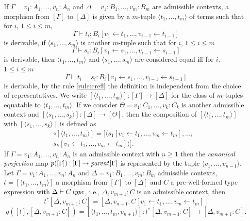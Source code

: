 If $\Gamma = v_1 \colon A_1, \dots, v_n \colon A_n$ and $\Delta = v_1 \colon B_1, \dots, v_m \colon B_m$
are admissible contexts, a morphism from $[\Gamma]$ to $[\Delta]$ is given by a $m$-tuple $\langle t_1, \dots, t_m \rangle$
of terms such that for $i$, $1 \leq i \leq m$, 
\[
    \Gamma \vdash t_i \colon B_i[v_1  \leftarrow  t_1, \dots, v_{i-1}  \leftarrow  t_{i-1}]
\] is derivable,
if $\langle s_1, \dots, s_m \rangle$ is another $m$-tuple such that for  $i$, $1 \leq i \leq m$
\[
    \Gamma \vdash s_i \colon B_i[v_1  \leftarrow  s_1, \dots, v_{i-1}  \leftarrow  s_{i-1}]
\] is derivable,
then $\langle t_1, \dots, t_m \rangle$ and $\langle s_1, \dots, s_m \rangle$ are considered equal
iff for $i$, $1 \leq i \leq m$
\[
    \Gamma \vdash t_i = s_i \colon B_i[v_1  \leftarrow  s_1, \dots, v_{i-1}  \leftarrow  s_{i-1}]
\] is derivable,
by the rule \ref{rule:crefl} the definition is independent from the choice of representatives.
We write $[\langle t_1, \dots, t_m \rangle] \colon [\Gamma] \to [\Delta]$ for the class of $m$-tuples equatable to $\langle t_1, \dots, t_m \rangle$.
If we consider $\Theta = v_1 \colon C_1, \dots, v_k \colon C_k$ is another admissible context and 
$[\langle s_1, \dots, s_k\rangle]\colon [\Delta] \to [\Theta]$, then the composition of $[\langle t_1, \dots, t_m \rangle]$
with $[\langle s_1, \dots, s_k \rangle]$ is defined as
\begin{align*}
    [\langle s_1, \dots, s_k \rangle] 
    \circ 
    [\langle t_1, \dots, t_m \rangle] 
    = 
    [\langle 
        s_1[v_1  \leftarrow  t_1, \dots, v_m  \leftarrow  t_m],
        \dots,& \\
        s_k[v_1  \leftarrow  t_1, \dots, v_m  \leftarrow  t_m]
    \rangle].&
\end{align*}
If $\Gamma = v_1 \colon A_1, \dots, v_n \colon A_n$ is an admissible context with $n \geq 1$ then the \textit{canonical projection}
map $p([\Gamma])\colon [\Gamma] \to \operatorname{\mathit{parent}} [\Gamma]$ is represented by the tuple $\langle v_1, \dots, v_{n-1} \rangle$.
Let $\Gamma = v_1 \colon A_1, \dots, v_n \colon A_n$ and $\Delta = v_1 \colon B_1, \dots, v_m \colon B_m$ 
admissible contexts, $t = [\langle t_1, \dots, t_m \rangle]$ a morphism from $[\Gamma]$ to $[\Delta]$ and 
$C$ a pre-well-formed type expression with $\Delta \vdash C \operatorname{\mathit{\space type}}$, i.e., $\Delta, v_{m+1} \colon C$ is
an admissible context, then 
\[
    t^*[\Delta, v_{m+1} \colon C] = [\Delta, v_{n+1} \colon C[v_1  \leftarrow  t_1, \dots, v_m  \leftarrow  t_m]]
\]
\[
    q([t], [\Delta, v_{m+1} \colon C]) = [\langle t_1, \dots, t_m, v_{n+1} \rangle] \colon t^*[\Delta, v_{m+1} \colon C] \to [\Delta, v_{m+1} \colon C].
\]
